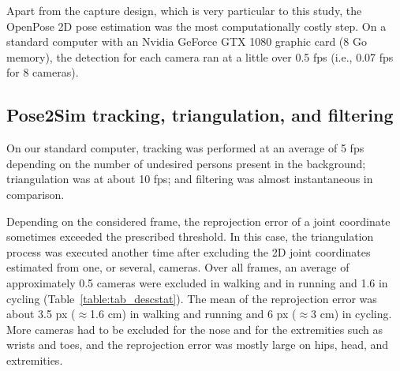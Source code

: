 Apart from the capture design, which is very particular to this study, the OpenPose 2D pose estimation was the most computationally costly step. On a standard computer with an Nvidia GeForce GTX 1080 graphic card (8 Go memory), the detection for each camera ran at a little over 0.5 fps (i.e., 0.07 fps for 8 cameras).


\subsection{Pose2Sim tracking, triangulation, and filtering}

On our standard computer, tracking was performed at an average of 5 fps depending on the number of undesired persons present in the background; triangulation was at about 10 fps; and filtering was almost instantaneous in comparison.

Depending on the considered frame, the reprojection error of a joint coordinate sometimes exceeded the prescribed threshold. In this case, the triangulation process was executed another time after excluding the 2D joint coordinates estimated from one, or several, cameras. Over all frames, an average of approximately 0.5 cameras were excluded in walking and in running and 1.6 in cycling (Table~\ref{table:tab_descstat}). The mean of the reprojection error was about 3.5 px ($\approx$1.6 cm) in walking and running and 6 px ($\approx$3 cm) in cycling. More cameras had to be excluded for the nose and for the extremities such as wrists and toes, and the reprojection error was mostly large on hips, head, and extremities.

